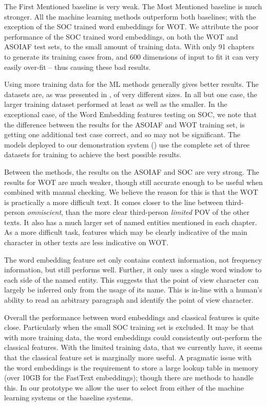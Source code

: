 \documentclass[11pt,a4paper]{article}
\begin{document}
The First Mentioned baseline is very weak.
The Most Mentioned baseline is much stronger.
All the machine learning methods outperform both baselines;
with the exception of the SOC trained word embeddings for WOT.
We attribute the poor performance of the SOC trained word embeddings, on both the  WOT and ASOIAF test sets, to the small amount of training data.
With only 91 chapters to generate its training cases from, and 600 dimensions of input to fit it can very easily over-fit -- thus causing these bad results.


Using more training data for the ML methods generally gives better results.
The datasets are, as was presented in , of very different sizes.
In all but one case, the larger training dataset performed at least as well as the smaller.
In the exceptional case, of the Word Embedding features testing on SOC,
we  note that the difference between the results for the ASOIAF and WOT training set,
is getting one additional test case correct, and so may not be significant.
The models deployed to our demonstration system () use the complete set of three datasets for training to achieve the best possible results.


Between the methods, the results on the ASOIAF and SOC are very strong.
The results for WOT are much weaker, though still accurate enough to be useful
when combined with manual checking.
We believe the reason for this is that the WOT is practically a more difficult text.
It comes closer to the line between third-person \emph{omniscient}, than the more clear third-person \emph{limited} POV of the other texts.
It also has a much larger set of named entities mentioned in each chapter.
As a more difficult task, features which may be clearly indicative of the main character in other texts are less indicative on WOT.


The word embedding feature set only contains context information, not frequency information, but still performs well.
Further, it only uses a single word window to each side of the named entity.
This suggests that the point of view character can largely be inferred only from the usage of its name. 
This is in-line with a human's ability to read an arbitrary paragraph and identify the point of view character.


Overall the performance between word embeddings and classical features is quite  close.
Particularly when the small SOC training set is excluded.
It may be that with more training data, the word embeddings could consistently out-perform the classical features.
With the limited training data, that we currently have, it seems that the classical feature set is marginally more useful.
A pragmatic issue with the word embeddings is the requirement to store a large lookup table in memory (over 10GB for the FastText embeddings); though there are methods to handle this.
In our prototype we allow the user to select from either of the machine learning systems or the baseline systems.
\end{document}

